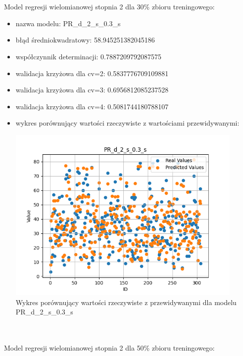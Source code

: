 \documentclass[11pt, a4paper, notitlepage]{report}
\begin{document}
\\ \\
Model regresji wielomianowej stopnia 2 dla 30\% zbioru treningowego:
\begin{itemize}
	\item nazwa modelu: PR\_d\_2\_s\_0.3\_s
	\item błąd średniokwadratowy: 58.945251382045186
	\item współczynnik determinacji: 0.7887209792087575
	\item walidacja krzyżowa dla cv=2: 0.5837776709109881
	\item walidacja krzyżowa dla cv=3: 0.6956812085237528
	\item walidacja krzyżowa dla cv=4: 0.5081744180788107
	\item wykres porównujący wartości rzeczywiste z wartościami przewidywanymi: \begin{center} \small
		\includegraphics[width=0.9\textwidth]{graphics/plots/PR_d_2_s_0.3_s.png} \\
		\caption{Wykres porównujący wartości rzeczywiste z przewidywanymi dla modelu PR\_d\_2\_s\_0.3\_s}
	\end{center}
\end{itemize}
\\ \\
Model regresji wielomianowej stopnia 2 dla 50\% zbioru treningowego:
\end{document}
